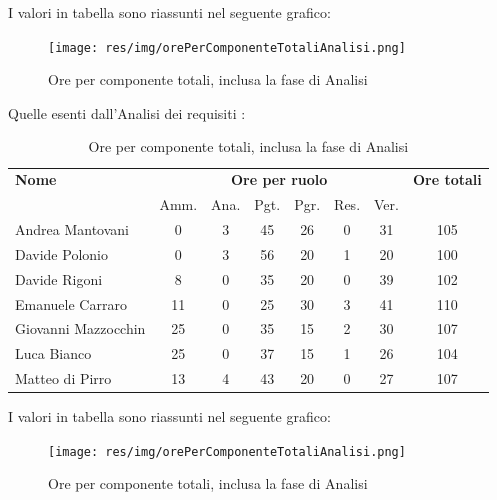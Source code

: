 I valori in tabella sono riassunti nel seguente grafico: \\ 

    \begin{figure}[H]
      \begin{center}
        \texttt{[image: res/img/orePerComponenteTotaliAnalisi.png]}
      \caption{Ore per componente totali, inclusa la fase di Analisi}
      \end{center} 
    \end{figure}    
    

Quelle esenti dall'Analisi dei requisiti :

\begin{table}[H]
\begin{tabular}{lccccccc}
\toprule
    \textbf{Nome}  & \multicolumn{6}{c}{\textbf{Ore per ruolo}} & \textbf{Ore totali} \\
     & Amm. & Ana. & Pgt. & Pgr. & Res. & Ver. & \\
    \midrule
   
	   Andrea Mantovani & 0 & 3 & 45 & 26 & 0 & 31 & 105 \\
	     Davide Polonio & 0 & 3 & 56 & 20 & 1 & 20 & 100 \\
	      Davide Rigoni & 8 & 0 & 35 & 20 & 0 & 39 & 102 \\
	   Emanuele Carraro & 11 & 0 & 25 & 30 & 3 & 41 & 110 \\
	Giovanni Mazzocchin & 25 & 0 & 35 & 15 & 2 & 30 & 107 \\
	        Luca Bianco & 25 & 0 & 37 & 15 & 1 & 26 & 104 \\
	    Matteo di Pirro & 13 & 4 & 43 & 20 & 0 & 27 & 107 \\
   
    \bottomrule
\end{tabular}
\caption{Ore per componente totali, inclusa la fase di Analisi}
\end{table}

I valori in tabella sono riassunti nel seguente grafico: \\ 

    \begin{figure}[H]
      \begin{center}
        \texttt{[image: res/img/orePerComponenteTotaliAnalisi.png]}
      \caption{Ore per componente totali, inclusa la fase di Analisi}
      \end{center} 
    \end{figure}    
    
    
